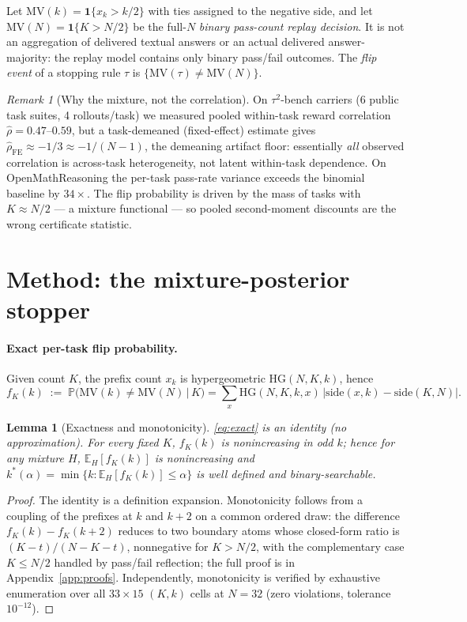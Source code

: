 \documentclass{article}
\newtheorem{lemma}{Lemma}
\theoremstyle{definition}
\theoremstyle{remark}
\newtheorem{remark}{Remark}
\newcommand{\HG}{\mathrm{HG}}
\newcommand{\MV}{\mathrm{MV}}
\newcommand{\E}{\mathbb{E}}
\renewcommand{\P}{\mathbb{P}}
\begin{document}
Let $\MV(k)=\mathbf{1}\{x_k>k/2\}$ with ties assigned to the negative side,
and let $\MV(N)=\mathbf{1}\{K>N/2\}$ be the full-$N$ \emph{binary
pass-count replay decision}.  It is not an aggregation of delivered textual
answers or an actual delivered answer-majority: the replay model contains only
binary pass/fail outcomes. The \emph{flip event} of a stopping rule $\tau$ is
$\{\MV(\tau)\neq\MV(N)\}$.

\begin{remark}[Why the mixture, not the correlation]
\label{rem:pooled}
On $\tau^2$-bench carriers (6 public task suites, 4 rollouts/task) we measured
pooled within-task reward correlation $\hat\rho=0.47$--$0.59$, but a
task-demeaned (fixed-effect) estimate gives $\hat\rho_{\mathrm{FE}}\approx-1/3
\approx-1/(N-1)$, the demeaning artifact floor: essentially \emph{all}
observed correlation is across-task heterogeneity, not latent within-task
dependence. On OpenMathReasoning the per-task pass-rate variance exceeds the
binomial baseline by $34\times$. The flip probability is driven by the mass of
tasks with $K\approx N/2$ --- a mixture functional --- so pooled
second-moment discounts are the wrong certificate statistic.
\end{remark}

\section{Method: the mixture-posterior stopper}
\label{sec:method}

\paragraph{Exact per-task flip probability.}
Given count $K$, the prefix count $x_k$ is hypergeometric
$\HG(N,K,k)$, hence
\begin{equation}
f_K(k) \;:=\; \P\big(\MV(k)\neq\MV(N)\,\big|\,K\big)
= \sum_{x}\HG(N,K,k,x)\,\big|\mathrm{side}(x,k)-\mathrm{side}(K,N)\big|.
\label{eq:exact}
\end{equation}

\begin{lemma}[Exactness and monotonicity]
\label{lem:exact}
\eqref{eq:exact} is an identity (no approximation). For every fixed $K$,
$f_K(k)$ is nonincreasing in odd $k$; hence for any mixture $H$,
$\E_H[f_K(k)]$ is nonincreasing and
$k^*(\alpha)=\min\{k:\E_H[f_K(k)]\le\alpha\}$ is well defined and
binary-searchable.
\end{lemma}
\begin{proof}
The identity is a definition expansion. Monotonicity follows from a
coupling of the prefixes at $k$ and $k{+}2$ on a common ordered draw:
the difference $f_K(k)-f_K(k{+}2)$ reduces to two boundary atoms whose
closed-form ratio is $(K-t)/(N-K-t)$, nonnegative for $K>N/2$, with the
complementary case $K\le N/2$ handled by pass/fail reflection; the full
proof is in Appendix~\ref{app:proofs}. Independently, monotonicity is
verified by exhaustive enumeration over all $33\times15$ $(K,k)$ cells
at $N=32$ (zero violations, tolerance $10^{-12}$).
\end{proof}
\end{document}
